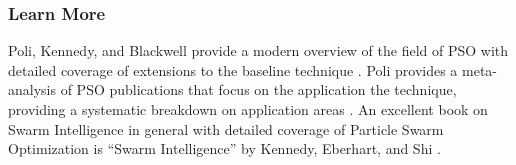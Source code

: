 % 
% 
\subsubsection{Learn More}
Poli, Kennedy, and Blackwell provide a modern overview of the field of PSO with detailed coverage of extensions to the baseline technique \cite{Poli2007}. Poli provides a meta-analysis of PSO publications that focus on the application the technique, providing a systematic breakdown on application areas \cite{Poli2008a}. 
An excellent book on Swarm Intelligence in general with detailed coverage of Particle Swarm Optimization is ``Swarm Intelligence'' by Kennedy, Eberhart, and Shi \cite{Kennedy2001}.



